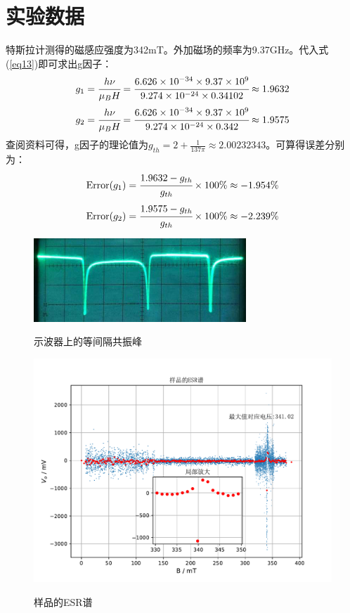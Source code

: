\documentclass[a4paper]{article}
\begin{document}
\section{实验数据}
特斯拉计测得的磁感应强度为342mT。外加磁场的频率为9.37GHz。代入式(\ref{eq13})即可求出g因子：
\begin{equation}
g_1 = \cfrac{h\nu}{\mu_B H} = \cfrac{6.626\times 10^{-34}\times 9.37\times 10^{9}}{9.274\times 10^{-24}\times 0.34102} \approx 1.9632
\end{equation}
\begin{equation}
g_2 = \cfrac{h\nu}{\mu_B H} = \cfrac{6.626\times 10^{-34}\times 9.37\times 10^{9}}{9.274\times 10^{-24}\times 0.342} \approx 1.9575
\end{equation}
查阅资料可得，g因子的理论值为$g_{th}=2+\frac{1}{137\pi} \approx 2.00232343$。可算得误差分别为：
\begin{equation}
\text{Error}(g_1) = \cfrac{1.9632 - g_{th}}{g_{th}}\times 100\% \approx -1.954\%
\end{equation}
\begin{equation}
\text{Error}(g_2) = \cfrac{1.9575 - g_{th}}{g_{th}}\times 100\% \approx -2.239\%
\end{equation}
\begin{figure}[!h]
\centering
\includegraphics[width=8cm]{fig/datafig.jpg}\\
\caption{示波器上的等间隔共振峰}\label{datafig1}
\end{figure}

\begin{figure}[!h]
\centering
\includegraphics[width=12cm]{fig/data.pdf}\\
\caption{样品的ESR谱}\label{dataESR}    
\end{figure}
\end{document}
